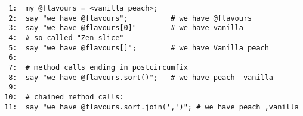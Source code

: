 \documentclass[11pt]{article}
\begin{document}
\begin{verbatim}
 1:  my @flavours = <vanilla peach>;
 2:  say "we have @flavours";          # we have @flavours
 3:  say "we have @flavours[0]"        # we have vanilla
 4:  # so-called "Zen slice"
 5:  say "we have @flavours[]";        # we have Vanilla peach 
 6:  
 7:  # method calls ending in postcircumfix
 8:  say "we have @flavours.sort()";   # we have peach  vanilla
 9:  
10:  # chained method calls:
11:  say "we have @flavours.sort.join(',')"; # we have peach ,vanilla
\end{verbatim}
\end{document}

